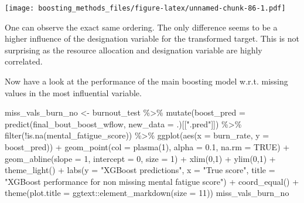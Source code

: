\documentclass[
]{book}
\newenvironment{Shaded}{\begin{snugshade}}{\end{snugshade}}
\newcommand{\AttributeTok}[1]{\textcolor[rgb]{0.77,0.63,0.00}{#1}}
\newcommand{\ConstantTok}[1]{\textcolor[rgb]{0.00,0.00,0.00}{#1}}
\newcommand{\DecValTok}[1]{\textcolor[rgb]{0.00,0.00,0.81}{#1}}
\newcommand{\FloatTok}[1]{\textcolor[rgb]{0.00,0.00,0.81}{#1}}
\newcommand{\FunctionTok}[1]{\textcolor[rgb]{0.00,0.00,0.00}{#1}}
\newcommand{\NormalTok}[1]{#1}
\newcommand{\OtherTok}[1]{\textcolor[rgb]{0.56,0.35,0.01}{#1}}
\newcommand{\SpecialCharTok}[1]{\textcolor[rgb]{0.00,0.00,0.00}{#1}}
\newcommand{\StringTok}[1]{\textcolor[rgb]{0.31,0.60,0.02}{#1}}
\begin{document}
\texttt{[image: boosting\_methods\_files/figure-latex/unnamed-chunk-86-1.pdf]}

One can observe the exact same ordering. The only difference seems to be a higher influence of the designation variable for the transformed target. This is not surprising as the resource allocation and designation variable are highly correlated.

Now have a look at the performance of the main boosting model w.r.t. missing values in the most influential variable.

\begin{Shaded}
\begin{Highlighting}[]
\NormalTok{miss\_vals\_burn\_no }\OtherTok{\textless{}{-}}\NormalTok{ burnout\_test }\SpecialCharTok{\%\textgreater{}\%}
  \FunctionTok{mutate}\NormalTok{(}\AttributeTok{boost\_pred =} \FunctionTok{predict}\NormalTok{(final\_bout\_boost\_wflow,}
                              \AttributeTok{new\_data =}\NormalTok{ .)[[}\StringTok{".pred"}\NormalTok{]]) }\SpecialCharTok{\%\textgreater{}\%}
  \FunctionTok{filter}\NormalTok{(}\SpecialCharTok{!}\FunctionTok{is.na}\NormalTok{(mental\_fatigue\_score)) }\SpecialCharTok{\%\textgreater{}\%}
  \FunctionTok{ggplot}\NormalTok{(}\FunctionTok{aes}\NormalTok{(}\AttributeTok{x =}\NormalTok{ burn\_rate, }\AttributeTok{y =}\NormalTok{ boost\_pred)) }\SpecialCharTok{+}
  \FunctionTok{geom\_point}\NormalTok{(}\AttributeTok{col =} \FunctionTok{plasma}\NormalTok{(}\DecValTok{1}\NormalTok{), }\AttributeTok{alpha =} \FloatTok{0.1}\NormalTok{, }\AttributeTok{na.rm =} \ConstantTok{TRUE}\NormalTok{) }\SpecialCharTok{+} 
  \FunctionTok{geom\_abline}\NormalTok{(}\AttributeTok{slope =} \DecValTok{1}\NormalTok{, }\AttributeTok{intercept =} \DecValTok{0}\NormalTok{, }\AttributeTok{size =} \DecValTok{1}\NormalTok{) }\SpecialCharTok{+}
  \FunctionTok{xlim}\NormalTok{(}\DecValTok{0}\NormalTok{,}\DecValTok{1}\NormalTok{) }\SpecialCharTok{+} \FunctionTok{ylim}\NormalTok{(}\DecValTok{0}\NormalTok{,}\DecValTok{1}\NormalTok{) }\SpecialCharTok{+}
  \FunctionTok{theme\_light}\NormalTok{() }\SpecialCharTok{+}
  \FunctionTok{labs}\NormalTok{(}\AttributeTok{y =} \StringTok{"XGBoost predictions"}\NormalTok{,}
       \AttributeTok{x =} \StringTok{"True score"}\NormalTok{,}
       \AttributeTok{title =} \StringTok{"XGBoost performance for non missing mental fatigue score"}\NormalTok{) }\SpecialCharTok{+}
  \FunctionTok{coord\_equal}\NormalTok{() }\SpecialCharTok{+}
  \FunctionTok{theme}\NormalTok{(}\AttributeTok{plot.title =}\NormalTok{ ggtext}\SpecialCharTok{::}\FunctionTok{element\_markdown}\NormalTok{(}\AttributeTok{size =} \DecValTok{11}\NormalTok{))}
\NormalTok{miss\_vals\_burn\_no}
\end{Highlighting}
\end{Shaded}
\end{document}
